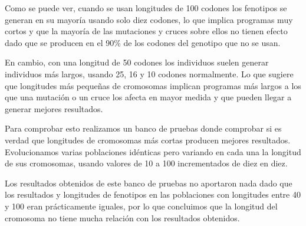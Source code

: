 Como se puede ver, cuando se usan longitudes de 100 codones los fenotipos se generan en su mayoría usando solo diez codones, lo que implica programas muy cortos y que la mayoría de las mutaciones y cruces sobre ellos no tienen efecto dado que se producen en el 90\% de los codones del genotipo que no se usan.

En cambio, con una longitud de 50 codones los individuos suelen generar individuos más largos, usando 25, 16 y 10 codones normalmente. Lo que sugiere que longitudes más pequeñas de cromosomas implican programas más largos a los que una mutación o un cruce los afecta en mayor medida y que pueden llegar a generar mejores resultados.

Para comprobar esto realizamos un banco de pruebas donde comprobar si es verdad que longitudes de cromosomas más cortas producen mejores resultados. Evolucionamos varias poblaciones idénticas pero variando en cada una la longitud de sus cromosomas, usando valores de 10 a 100 incrementados de diez en diez.

Los resultados obtenidos de este banco de pruebas no aportaron nada dado que los resultados y longitudes de fenotipos en las poblaciones con longitudes entre 40 y 100 eran prácticamente iguales, por lo que concluimos que la longitud del cromosoma no tiene mucha relación con los resultados obtenidos.

